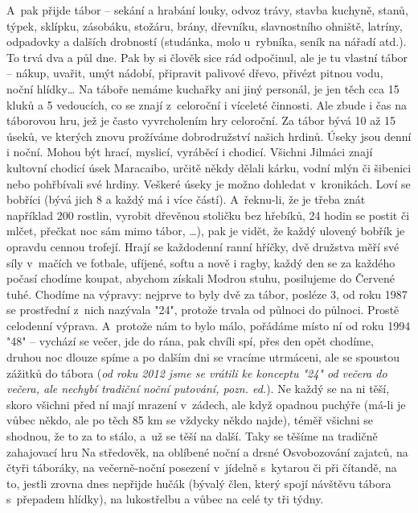 \documentclass[a5paper, 11pt, twoside]{article}
\begin{document}
A~pak přijde tábor -- sekání a hrabání louky, odvoz trávy, stavba
kuchyně, stanů, týpek, sklípku, zásobáku, stožáru, brány, dřevníku,
slavnostního ohniště, latríny, odpadovky a dalších drobností (studánka,
molo u~rybníka, seník na nářadí atd.). To trvá dva a půl dne. Pak by si
člověk sice rád odpočinul, ale je tu vlastní tábor -- nákup, uvařit,
umýt nádobí, připravit palivové dřevo, přivézt pitnou vodu, noční
hlídky\ldots{} Na táboře nemáme kuchařky ani jiný personál, je jen těch
cca 15 kluků a 5 vedoucích, co se znají z~celoroční i víceleté činnosti.
Ale zbude i čas na táborovou hru, jež je často vyvrcholením hry
celoroční. Za tábor bývá 10 až 15 úseků, ve kterých znovu prožíváme
dobrodružství našich hrdinů. Úseky jsou denní i noční. Mohou být hrací,
myslicí, vyráběcí i chodicí. Všichni Jilmáci znají kultovní chodicí úsek
Maracaibo, určitě někdy dělali kárku, vodní mlýn či šibenici nebo
pohřbívali své hrdiny. Veškeré úseky je možno dohledat v~kronikách. Loví
se bobříci (bývá jich 8 a každý má i více částí). A~řeknu-li, že je
třeba znát například 200 rostlin, vyrobit dřevěnou stoličku bez hřebíků,
24 hodin se postit či mlčet, přečkat noc sám mimo tábor, \ldots{}), pak je
vidět, že každý ulovený bobřík je opravdu cennou trofejí. Hrají se
každodenní ranní hříčky, dvě družstva měří své síly v~mačích ve fotbale,
ufíjené, softu a nově i ragby, každý den se za každého počasí chodíme
koupat, abychom získali Modrou stuhu, posilujeme do Červené tuhé.
Chodíme na výpravy: nejprve to byly dvě za tábor, posléze 3, od roku
1987 se prostřední z~nich nazývala "24", protože trvala od půlnoci do
půlnoci. Prostě celodenní výprava. A~protože nám to bylo málo, pořádáme
místo ní od roku 1994 "48" -- vychází se večer, jde do rána, pak chvíli
spí, přes den opět chodíme, druhou noc dlouze spíme a po dalším dni se
vracíme utrmáceni, ale se spoustou zážitků do tábora (\textit{od roku 2012
jsme se vrátili ke konceptu "24" od večera do večera, ale nechybí
tradiční noční putování, pozn. ed.}). Ne každý se na ni těší, skoro
všichni před ní mají mrazení v~zádech, ale když opadnou puchýře (má-li
je vůbec někdo, ale po těch 85 km se vždycky někdo najde), téměř všichni
se shodnou, že to za to stálo, a~už se těší na další. Taky se těšíme na
tradičně zahajovací hru Na středověk, na oblíbené noční a drsné
Osvobozování zajatců, na čtyři táboráky, na večerně-noční posezení
v~jídelně s~kytarou či při čítandě, na to, jestli zrovna dnes nepřijde
hučák (bývalý člen, který spojí návštěvu tábora s~přepadem hlídky), na
lukostřelbu a vůbec na celé ty tři týdny.
\vspace{\fill}
\end{document}
